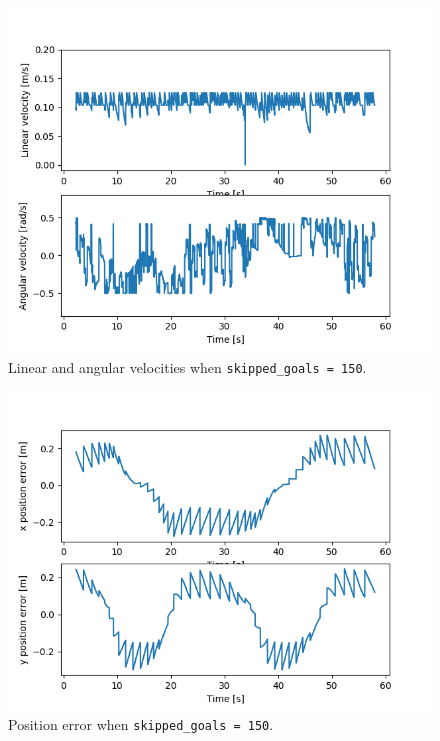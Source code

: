 \documentclass[11pt,a4paper]{article}
\begin{document}
\begin{figure}[H]
    \centering
    \includegraphics[scale=0.4]{different_params/dwa_skippedgoals150/Linear_and_Angular_Velocities.png}
    \caption{Linear and angular velocities when \texttt{skipped\_goals = 150}.}
\end{figure}

\begin{figure}[H]
    \centering
    \includegraphics[scale=0.4]{different_params/dwa_skippedgoals150/Position_Error.png}
    \caption{Position error when \texttt{skipped\_goals = 150}.}
\end{figure}
\end{document}

